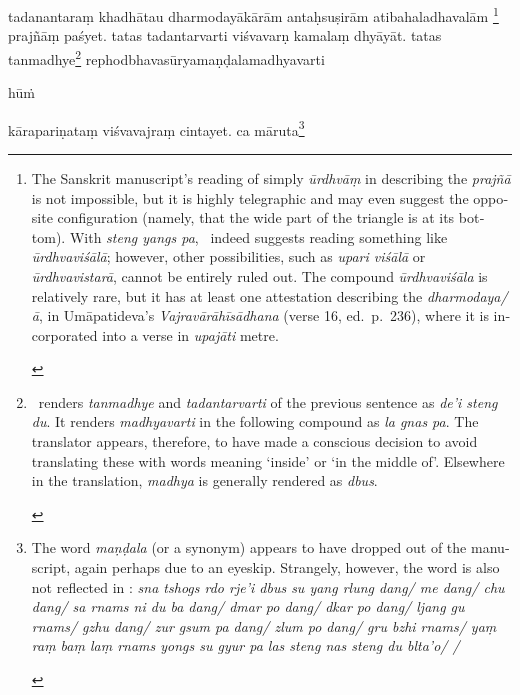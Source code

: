 \documentclass[naipra.tex]{subfiles}
\begin{document}
\begin{sanskrit}
\pstart
tadanantaraṃ khadhātau dharmodayākārām antaḥsuṣirām atibahaladhavalām \footnote{
	\begin{english}%
		The Sanskrit manuscript's reading of simply \emph{ūrdhvāṃ} in describing the \emph{prajñā} is not impossible, but it is highly telegraphic and may even suggest the opposite configuration (namely, that the wide part of the triangle is at its bottom).
		With \emph{steng yangs pa}, \TIB\ indeed suggests reading something like \emph{ūrdhvaviśālā}; however, other possibilities, such as \emph{upari viśālā} or \emph{ūrdhvavistarā}, cannot be entirely ruled out.
		The compound \emph{ūrdhvaviśāla} is relatively rare, but it has at least one attestation describing the \emph{dharmodaya/ā}, in Umāpatideva's \emph{Vajravārāhīsādhana} (verse 16, ed.\ p.\ 236), where it is incorporated into a verse in \emph{upajāti} metre.
	\end{english}
} prajñāṃ paśyet.
tatas tadantarvarti viśvavarṇ  kamalaṃ dhyāyāt.
tatas tanmadhye\footnote{
	\begin{english}%
		\TIB\ renders \emph{tanmadhye} and \emph{tadantarvarti} of the previous sentence as \emph{de'i steng du}.
		It renders \emph{madhyavarti} in the following compound as \emph{la gnas pa}. 
		The translator appears, therefore, to have made a conscious decision to avoid translating these with words meaning `inside' or `in the middle of'.
		Elsewhere in the translation, \emph{madhya} is generally rendered as \emph{dbus}.
	\end{english}
} rephodbhavasūryamaṇḍalamadhyavarti\dsh \begin{mantra}hūṁ\end{mantra}\dsh kārapariṇataṃ viśvavajraṃ cintayet. 
 ca māruta\footnote{
	\begin{english}%
		The word \emph{maṇḍala} (or a synonym) appears to have dropped out of the manuscript, again perhaps due to an eyeskip.
		Strangely, however, the word is also not reflected in \TIB : \emph{sna tshogs rdo rje'i dbus su yang rlung dang/ me dang/ chu dang/ sa rnams ni du ba dang/ dmar po dang/ dkar po dang/ ljang gu rnams/ gzhu dang/ zur gsum pa dang/ zlum po dang/ gru bzhi rnams/ yaṃ raṃ baṃ laṃ rnams yongs su gyur pa las steng nas steng du blta'o/ /}

\end{english}}
\end{sanskrit}
\end{document}
